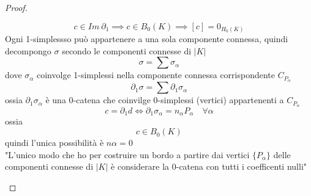 \documentclass[a4paper]{report}
\begin{document}
\begin{proof}
\begin{enumerate}
            \[
                c\in Im\ \partial_1\implies c\in B_0(K)\implies [c]=0_{H_0(K)}
            \]
            Ogni 1-simplessso può appartenere a una sola componente connessa, quindi decompongo $\sigma$ secondo le componenti connesse di $|K|$
            \[
                \sigma=\sum\sigma_\alpha
            \]
            dove $\sigma_\alpha$ coinvolge 1-simplessi nella componente connessa corrispondente $C_{P_\alpha}$
            \[
                \partial_1\sigma=\sum\partial_1\sigma_\alpha
            \]
            ossia $\partial_1\sigma_\alpha$ è una 0-catena che coinvilge 0-simplessi (vertici) appartenenti a $C_{P_\alpha}$
            \[
                c=\partial_1 d\Longleftrightarrow\partial_1\sigma_\alpha=n_\alpha P_\alpha\quad \forall\alpha
            \]
            ossia
            \[
                c\in B_0(K)
            \]
            quindi l'unica possibilità è $n\alpha=0$\\
            "L'unico modo che ho per costruire un bordo a partire dai vertici $\{P_\alpha\}$ delle componenti connesse di $|K|$ è considerare la 0-catena con tutti i coefficenti nulli"
    \end{enumerate}
\end{proof}
\end{document}
